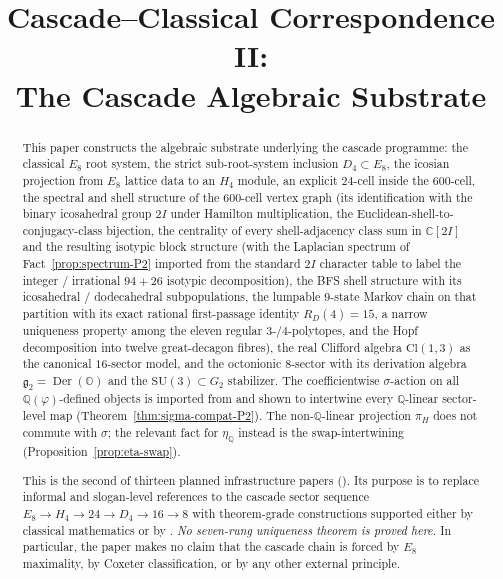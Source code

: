 \documentclass[11pt, a4paper]{amsart}
\title{Cascade--Classical Correspondence II:\\
  The Cascade Algebraic Substrate}
\author{}
\date{}
\theoremstyle{definition}
\newcommand{\Q}{\mathbb{Q}}
\newcommand{\C}{\mathbb{C}}
\newcommand{\OO}{\mathbb{O}}
\newcommand{\Der}{\operatorname{Der}}
\newcommand{\Cl}{\mathrm{Cl}}
\newcommand{\SU}{\mathrm{SU}}
\begin{document}
\maketitle

\begin{abstract}
This paper constructs the algebraic substrate underlying the cascade
programme: the classical $E_8$ root system, the strict
sub-root-system inclusion $D_4 \subset E_8$, the icosian projection
from $E_8$ lattice data to an $H_4$ module, an explicit $24$-cell
inside the $600$-cell, the spectral and shell structure of the
$600$-cell vertex graph (its identification with the binary
icosahedral group $2I$ under Hamilton multiplication, the
Euclidean-shell-to-conjugacy-class bijection, the centrality of
every shell-adjacency class sum in $\C[2I]$ and the resulting
isotypic block structure (with the Laplacian spectrum of
Fact~\ref{prop:spectrum-P2} imported from the standard $2I$
character table to label the integer / irrational $94{+}26$
isotypic decomposition), the BFS shell structure with its
icosahedral /
dodecahedral subpopulations, the lumpable $9$-state Markov chain
on that partition with its exact rational first-passage identity
$R_D(4) = 15$, a narrow uniqueness property among the eleven
regular $3$-/$4$-polytopes, and the Hopf decomposition into
twelve great-decagon fibres), the real Clifford algebra $\Cl(1,3)$
as the canonical $16$-sector model, and the octonionic $8$-sector
with its derivation algebra $\mathfrak{g}_2 = \Der(\OO)$ and the
$\SU(3) \subset G_2$ stabilizer. The coefficientwise $\sigma$-action
on all $\Q(\varphi)$-defined objects is imported from
\cite{SigmaRationality} and shown to intertwine every $\Q$-linear
sector-level map (Theorem~\ref{thm:sigma-compat-P2}). The
non-$\Q$-linear projection $\pi_H$ does not commute with
$\sigma$; the relevant fact for $\eta_\Q$ instead is the
swap-intertwining (Proposition~\ref{prop:eta-swap}).

This is the second of thirteen planned infrastructure papers
(\cite[P2]{CascadeInfrastructurePlan}). Its purpose is to replace
informal and slogan-level references to the cascade sector sequence
$E_8 \to H_4 \to 24 \to D_4 \to 16 \to 8$ with theorem-grade
constructions supported either by classical mathematics or by
\cite{SigmaRationality}. \emph{No seven-rung uniqueness theorem is
proved here.} In particular, the paper makes no claim that the
cascade chain is forced by $E_8$ maximality, by Coxeter
classification, or by any other external principle.


\end{abstract}
\end{document}
